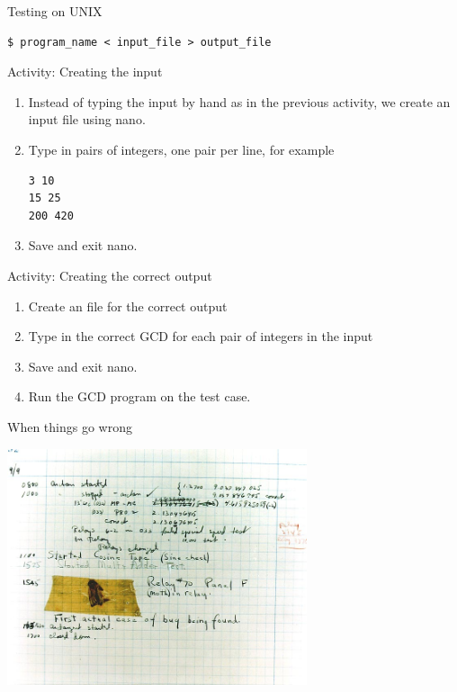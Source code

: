 \begin{frame}[fragile]{Testing on UNIX}
\begin{Large}
\begin{verbatim}
$ program_name < input_file > output_file
\end{verbatim}
\end{Large}
\end{frame}

\begin{frame}[fragile]{Activity: Creating the input}
\begin{enumerate}
\item Instead of typing the input by hand as in the previous activity, we create
an input file using nano. 
\item Type in pairs of integers, one pair per line, for example
\begin{verbatim}
3 10
15 25
200 420
\end{verbatim}
\item Save and exit nano. 
\end{enumerate}
\end{frame}

\begin{frame}{Activity: Creating the correct output}
\begin{enumerate}
\item Create an file for the correct output
\item Type in the correct GCD for each pair of integers in the input
\item Save and exit nano.  
\item Run the GCD program on the test case. 
\end{enumerate}
\end{frame}

\begin{frame}{When things go wrong}
\begin{center}
\includegraphics[width=250pt]{bug}
\end{center}
\end{frame}

